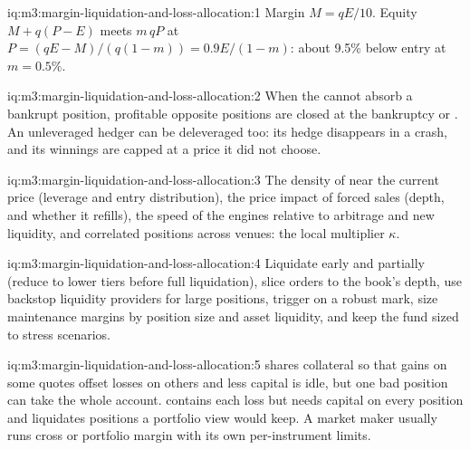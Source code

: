 \begin{solution}{iq:m3:margin-liquidation-and-loss-allocation:1}
Margin $M = qE/10$. Equity $M + q(P - E)$ meets $m\,qP$ at $P = (qE - M)/(q(1 - m)) = 0.9E/(1 - m)$: about 9.5\% below entry
at $m = 0.5\%$.
\end{solution}

\begin{solution}{iq:m3:margin-liquidation-and-loss-allocation:2}
When the  cannot absorb a bankrupt position, profitable opposite positions are closed at the bankruptcy or . An unleveraged hedger can be deleveraged too: its hedge disappears in a crash, and its winnings are capped at a price it
did not choose.
\end{solution}

\begin{solution}{iq:m3:margin-liquidation-and-loss-allocation:3}
The density of  near the current price (leverage and entry distribution), the price impact of forced sales
(depth, and whether it refills), the speed of the engines relative to arbitrage and new liquidity, and correlated positions
across venues: the local multiplier $\kappa$.
\end{solution}

\begin{solution}{iq:m3:margin-liquidation-and-loss-allocation:4}
Liquidate early and partially (reduce to lower tiers before full liquidation), slice orders to the book's depth, use backstop
liquidity providers for large positions, trigger on a robust mark, size maintenance margins by position size and asset
liquidity, and keep the fund sized to stress scenarios.
\end{solution}

\begin{solution}{iq:m3:margin-liquidation-and-loss-allocation:5}
 shares collateral so that gains on some quotes offset losses on others and less capital is idle, but one bad
position can take the whole account.  contains each loss but needs capital on every position and liquidates
positions a portfolio view would keep. A market maker usually runs cross or portfolio margin with its own per-instrument limits.
\end{solution}

